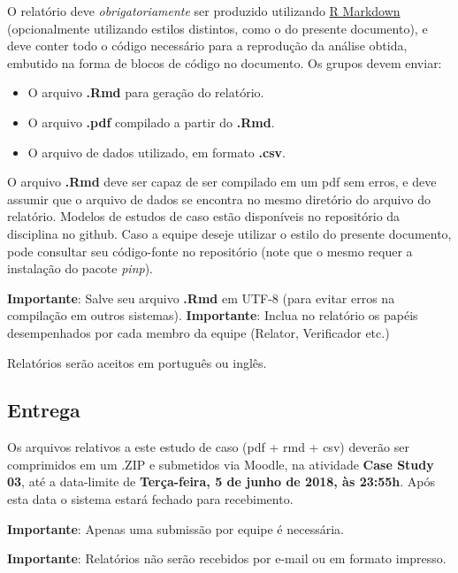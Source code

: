 \documentclass[11pt,twoside,printwatermark=false]{pinp}
\providecommand{\tightlist}{%
  \setlength{\itemsep}{0pt}\setlength{\parskip}{0pt}}
\begin{document}
O relatório deve \emph{obrigatoriamente} ser produzido utilizando
\href{http://rmarkdown.rstudio.com}{R Markdown} (opcionalmente
utilizando estilos distintos, como o do presente documento), e deve
conter todo o código necessário para a reprodução da análise obtida,
embutido na forma de blocos de código no documento. Os grupos devem
enviar:

\begin{itemize}
\tightlist
\item
  O arquivo \textbf{.Rmd} para geração do relatório.
\item
  O arquivo \textbf{.pdf} compilado a partir do \textbf{.Rmd}.
\item
  O arquivo de dados utilizado, em formato \textbf{.csv}.
\end{itemize}

O arquivo \textbf{.Rmd} deve ser capaz de ser compilado em um pdf sem
erros, e deve assumir que o arquivo de dados se encontra no mesmo
diretório do arquivo do relatório. Modelos de estudos de caso estão
disponíveis no repositório da disciplina no github. Caso a equipe deseje
utilizar o estilo do presente documento, pode consultar seu código-fonte
no repositório (note que o mesmo requer a instalação do pacote
\emph{pinp}).

\textbf{Importante}: Salve seu arquivo \textbf{.Rmd} em UTF-8 (para
evitar erros na compilação em outros sistemas). \textbf{Importante}:
Inclua no relatório os papéis desempenhados por cada membro da equipe
(Relator, Verificador etc.)

Relatórios serão aceitos em português ou inglês.

\subsection{Entrega}\label{entrega}

Os arquivos relativos a este estudo de caso (pdf + rmd + csv) deverão
ser comprimidos em um .ZIP e submetidos via Moodle, na atividade
\textbf{Case Study 03}, até a data-limite de \textbf{Terça-feira, 5 de
junho de 2018, às 23:55h}. Após esta data o sistema estará fechado para
recebimento.

\textbf{Importante}: Apenas uma submissão por equipe é necessária.

\textbf{Importante}: Relatórios não serão recebidos por e-mail ou em
formato impresso.





\end{document}
